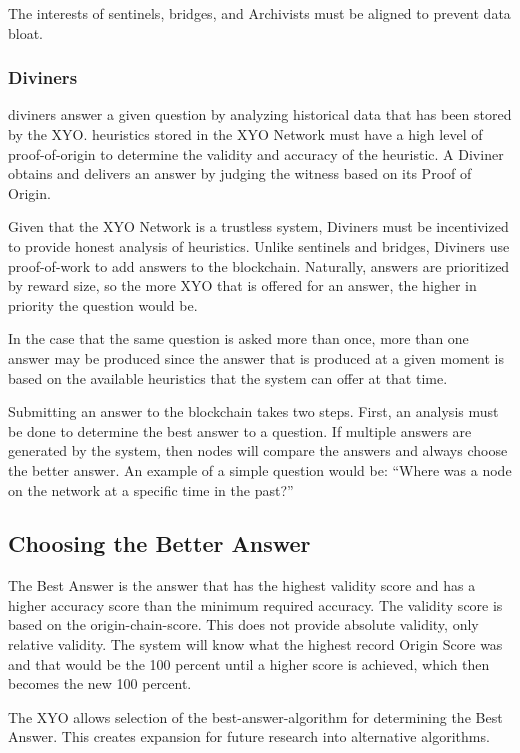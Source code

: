 \documentclass{article}
\begin{document}
The interests of \Glspl{sentinel}, \Glspl{bridge}, and Archivists must be aligned to prevent data bloat.

\subsubsection {Diviners}
\Glspl{diviner} answer a given question by analyzing historical data that has been stored by the \Gls{XYO}. \Glspl{heuristic} stored in the XYO Network must have a high level of \Gls{proof-of-origin} to determine the validity and \gls{accuracy} of the heuristic. A Diviner obtains and delivers an answer by judging the witness based on its Proof of Origin.

Given that the XYO Network is a trustless system, Diviners must be incentivized to provide honest analysis of heuristics. Unlike \Glspl{sentinel} and \Glspl{bridge}, Diviners use \Gls{proof-of-work} to add answers to the blockchain. Naturally, answers are prioritized by reward size, so the more XYO that is offered for an answer, the higher in priority the question would be.

In the case that the same question is asked more than once, more than one answer may be produced since the answer that is produced at a given moment is based on the available heuristics that the system can offer at that time.

Submitting an answer to the blockchain takes two steps. First, an analysis must be done to determine the best answer to a question. If multiple answers are generated by the system, then nodes will compare the answers and always choose the better answer. An example of a simple question would be: ``Where was a node on the network at a specific time in the past?''

\subsection {Choosing the Better Answer}
The Best Answer is the answer that has the highest validity score and has a higher \gls{accuracy} score than the minimum required accuracy. The validity score is based on the \Gls{origin-chain-score}. This does not provide absolute validity, only relative validity. The system will know what the highest record Origin Score was and that would be the 100 percent until a higher score is achieved, which then becomes the new 100 percent.

The \Gls{XYO} allows selection of the \Gls{best-answer-algorithm} for determining the Best Answer. This creates expansion for future research into alternative algorithms.
\end{document}
